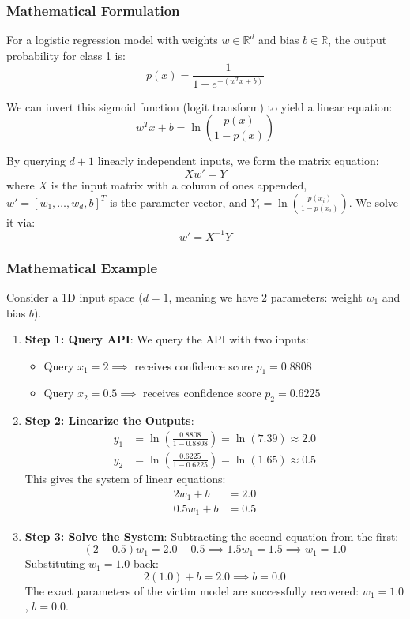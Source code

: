 \documentclass{article}
\begin{document}
\subsubsection{Mathematical Formulation}
For a logistic regression model with weights $w \in \mathbb{R}^d$ and bias $b \in \mathbb{R}$, the output probability for class 1 is:
$$p(x) = \frac{1}{1 + e^{-(w^T x + b)}}$$

We can invert this sigmoid function (logit transform) to yield a linear equation:
\begin{equation}
    w^T x + b = \ln \left( \frac{p(x)}{1 - p(x)} \right)
\end{equation}

By querying $d+1$ linearly independent inputs, we form the matrix equation:
\begin{equation}
    X w' = Y
\end{equation}
where $X$ is the input matrix with a column of ones appended, $w' = [w_1, \dots, w_d, b]^T$ is the parameter vector, and $Y_i = \ln \left( \frac{p(x_i)}{1 - p(x_i)} \right)$. We solve it via:
\begin{equation}
    w' = X^{-1} Y
\end{equation}

\subsubsection{Mathematical Example}
Consider a 1D input space ($d=1$, meaning we have $2$ parameters: weight $w_1$ and bias $b$).
\begin{enumerate}
    \item \textbf{Step 1: Query API}: We query the API with two inputs:
    \begin{itemize}
        \item Query $x_1 = 2 \implies$ receives confidence score $p_1 = 0.8808$
        \item Query $x_2 = 0.5 \implies$ receives confidence score $p_2 = 0.6225$
    \end{itemize}
    
    \item \textbf{Step 2: Linearize the Outputs}:
    \begin{align*}
        y_1 &= \ln \left( \frac{0.8808}{1 - 0.8808} \right) = \ln(7.39) \approx 2.0 \\
        y_2 &= \ln \left( \frac{0.6225}{1 - 0.6225} \right) = \ln(1.65) \approx 0.5
    \end{align*}
    This gives the system of linear equations:
    \begin{align*}
        2 w_1 + b &= 2.0 \\
        0.5 w_1 + b &= 0.5
    \end{align*}
    
    \item \textbf{Step 3: Solve the System}: Subtracting the second equation from the first:
    $$(2 - 0.5) w_1 = 2.0 - 0.5 \implies 1.5 w_1 = 1.5 \implies w_1 = 1.0$$
    Substituting $w_1 = 1.0$ back:
    $$2(1.0) + b = 2.0 \implies b = 0.0$$
    The exact parameters of the victim model are successfully recovered: $w_1 = 1.0$, $b = 0.0$.
\end{enumerate}
\end{document}

